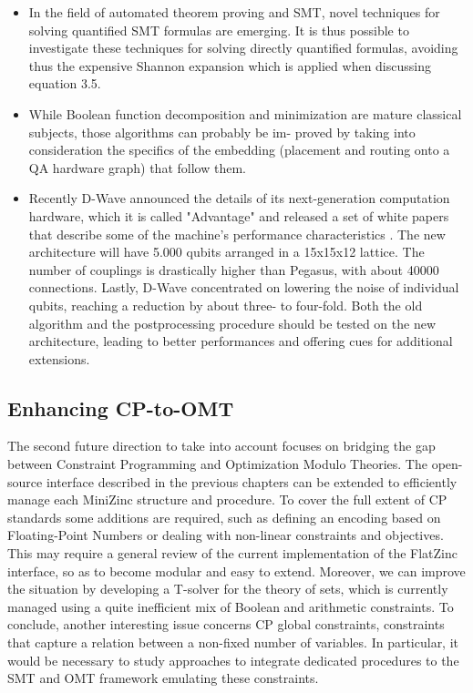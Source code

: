 \begin{itemize}
    \item In the field of automated theorem proving and SMT, novel
techniques for solving quantified SMT formulas are emerging. It is thus possible to investigate these techniques for solving directly quantified formulas,
avoiding thus the expensive Shannon expansion which is applied when discussing equation 3.5.
    \item While Boolean function decomposition and minimization are mature classical subjects, those algorithms can probably be im-
proved by taking into consideration the specifics of the embedding (placement and routing onto a QA hardware graph) that follow them.
    \item Recently D-Wave announced the details of its next-generation computation hardware, which it is called "Advantage" and released a set of white papers that describe some of the machine's performance characteristics \cite{advantage}. The new architecture will have 5.000 qubits arranged in a 15x15x12 lattice. The number of couplings is drastically higher than Pegasus, with about 40000 connections. Lastly, D-Wave concentrated on lowering the noise of individual qubits, reaching a reduction by about three- to four-fold. Both the old algorithm and the postprocessing procedure should be tested on the new architecture, leading to better performances and offering cues for additional extensions.
\end{itemize}

\pagebreak

\subsection{Enhancing CP-to-OMT}

The second future direction to take into account focuses on bridging the gap between Constraint Programming and Optimization Modulo Theories. The open-source interface described in the previous chapters can be extended to efficiently manage each MiniZinc structure and procedure. To cover the full extent of CP standards some additions are required, such as defining an encoding based on Floating-Point Numbers or dealing with non-linear constraints and objectives. This may require a general review of the current implementation of the FlatZinc interface, so as to become modular and easy to extend.
Moreover, we can improve the situation by developing a T-solver for the theory of sets, which is currently managed using a quite inefficient mix of Boolean and arithmetic constraints. 
To conclude, another interesting issue concerns CP global constraints, constraints that capture a relation between a non-fixed number of variables. In particular, it would be necessary to study approaches to integrate dedicated procedures to the SMT and OMT framework emulating these constraints. \\
 



